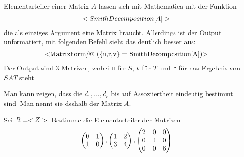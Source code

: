 \begin{mathematica}
	Elementarteiler einer Matrix $A$ lassen sich mit Mathematica mit der Funktion
	\begin{align}
	\texttt{SmithDecomposition[A]}\notag
	\end{align}
	die als einziges Argument eine Matrix braucht. Allerdings ist der Output unformatiert, mit folgenden Befehl sieht das deutlich besser aus:
	\begin{align}
	\text{\texttt{MatrixForm/@ (\{u,r,v\} = SmithDecomposition[A])}}\notag
	\end{align}
	Der Output sind 3 Matrizen, wobei \texttt{u} für $S$, \texttt{v} für $T$ und \texttt{r} für das Ergebnis von $SAT$ steht.
\end{mathematica}

\begin{remark}
	Man kann zeigen, dass die $d_1,...,d_r$ bis auf Assoziiertheit eindeutig bestimmt sind. Man nennt sie deshalb  der Matrix $A$.
\end{remark}

\begin{example}
	Sei $R=\whole$. Bestimme die Elementarteiler der Matrizen
	\begin{align}
		\begin{pmatrix}0&1\\1&0\end{pmatrix},\begin{pmatrix}1&2 \\ 3&4\end{pmatrix},\begin{pmatrix}2&0&0 \\ 0&4&0 \\0&0&6\end{pmatrix}\notag
	\end{align}
\end{example}

